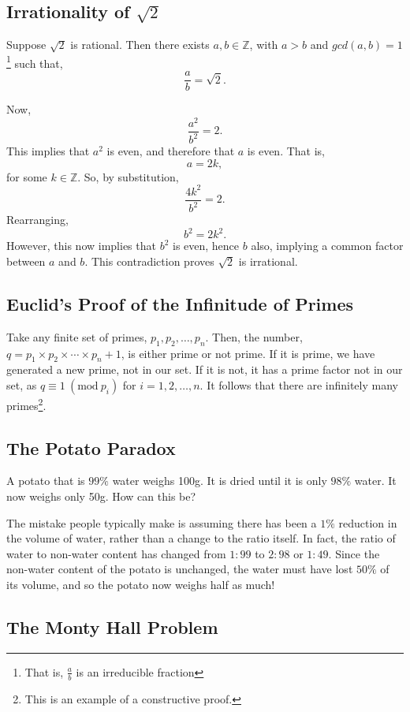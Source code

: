 \documentclass[11pt]{amsart}
\begin{document}
\subsection{Irrationality of $\sqrt{2}$}

Suppose $\sqrt{2}$ is rational. Then there exists $a, b \in \mathbb{Z}$, with $a > b$ and $gcd(a, b) = 1$\footnote{That is, $\frac{a}{b}$ is an irreducible fraction} such that, $$\frac{a}{b} = \sqrt{2}.$$

Now, $$\frac{a^2}{b^2} = 2.$$ This implies that $a^2$ is even, and therefore that $a$ is even. That is, $$a = 2k,$$ for some $k \in \mathbb{Z}$. So, by substitution, $$\frac{4k^2}{b^2} = 2.$$ Rearranging, $$b^2 = 2k^2.$$ However, this now implies that $b^2$ is even, hence $b$ also, implying a common factor between $a$ and $b$. This contradiction proves $\sqrt{2}$ is irrational.

\subsection{Euclid's Proof of the Infinitude of Primes}

Take any finite set of primes, $p_1, p_2, \dots, p_n$. Then, the number, $q = p_1 \times p_2 \times \cdots \times p_n + 1$, is either prime or not prime. If it is prime, we have generated a new prime, not in our set. If it is not, it has a prime factor not in our set, as $q \equiv 1 \ (\text{mod}\ p_i)$ for $i = 1, 2, \dots, n$. It follows that there are infinitely many primes\footnote{This is an example of a constructive proof.}.

\subsection{The Potato Paradox}

A potato that is $99\%$ water weighs 100g. It is dried until it is only $98\%$ water. It now weighs only 50g. How can this be?

The mistake people typically make is assuming there has been a $1\%$ reduction in the volume of water, rather than a change to the ratio itself. In fact, the ratio of water to non-water content has changed from $1:99$ to $2:98$ or $1:49$. Since the non-water content of the potato is unchanged, the water must have lost $50\%$ of its volume, and so the potato now weighs half as much!

\subsection{The Monty Hall Problem}
\end{document}
